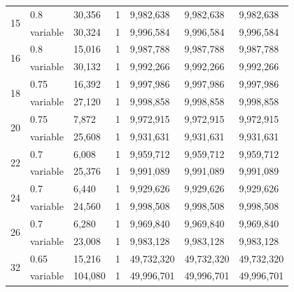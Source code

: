 \documentclass{sig-alternate}
\begin{document}
\begin{table}
\begin{tabular}{|l|l|l|l|l|l|l|}
\multirow{2}{*}{15}&  0.8&            30,356&             1&      9,982,638&          9,982,638&          9,982,638\\
&                     variable&       30,324&             1&      9,996,584&          9,996,584&          9,996,584\\ \hline
\multirow{2}{*}{16}&  0.8&            15,016&             1&      9,987,788&          9,987,788&          9,987,788\\
&                     variable&       30,132&             1&      9,992,266&          9,992,266&          9,992,266\\ \hline
\multirow{2}{*}{18}&  0.75&           16,392&             1&      9,997,986&          9,997,986&          9,997,986\\
&                     variable&       27,120&             1&      9,998,858&          9,998,858&          9,998,858\\ \hline
\multirow{2}{*}{20}&  0.75&           7,872&              1&      9,972,915&          9,972,915&          9,972,915\\
&                     variable&       25,608&             1&      9,931,631&          9,931,631&          9,931,631\\ \hline
\multirow{2}{*}{22}&  0.7&            6,008&              1&      9,959,712&          9,959,712&          9,959,712\\
&                     variable&       25,376&             1&      9,991,089&          9,991,089&          9,991,089\\ \hline
\multirow{2}{*}{24}&  0.7&            6,440&              1&      9,929,626&          9,929,626&          9,929,626\\
&                     variable&       24,560&             1&      9,998,508&          9,998,508&          9,998,508\\ \hline
\multirow{2}{*}{26}&  0.7&            6,280&              1&      9,969,840&          9,969,840&          9,969,840\\
&                     variable&       23,008&             1&      9,983,128&          9,983,128&          9,983,128\\ \hline
\multirow{2}{*}{32}&  0.65&           15,216&             1&      49,732,320&         49,732,320&         49,732,320\\
&                     variable&       104,080&            1&      49,996,701&         49,996,701&         49,996,701\\
\hline\end{tabular}
\label{table:numuniquesol}
\end{table}
\end{document}
